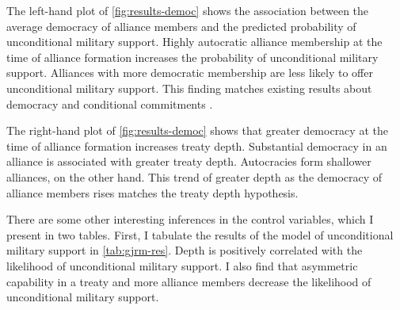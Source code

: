 \documentclass[12pt]{article}
\begin{document}
The left-hand plot of \autoref{fig:results-democ} shows the association between the average democracy of alliance members and the predicted probability of unconditional military support. 
Highly autocratic alliance membership at the time of alliance formation increases the probability of unconditional military support. 
Alliances with more democratic membership are less likely to offer unconditional military support. 
This finding matches existing results about democracy and conditional commitments \citep{Mattes2012, Chibaetal2015}.


The right-hand plot of \autoref{fig:results-democ} shows that greater democracy at the time of alliance formation increases treaty depth. 
Substantial democracy in an alliance is associated with greater treaty depth. 
Autocracies form shallower alliances, on the other hand. 
This trend of greater depth as the democracy of alliance members rises matches the treaty depth hypothesis. 


There are some other interesting inferences in the control variables, which I present in two tables. 
First, I tabulate the results of the model of unconditional military support in \autoref{tab:gjrm-res}.
Depth is positively correlated with the likelihood of unconditional military support.
I also find that asymmetric capability in a treaty and more alliance members decrease the likelihood of unconditional military support. 
\end{document}
